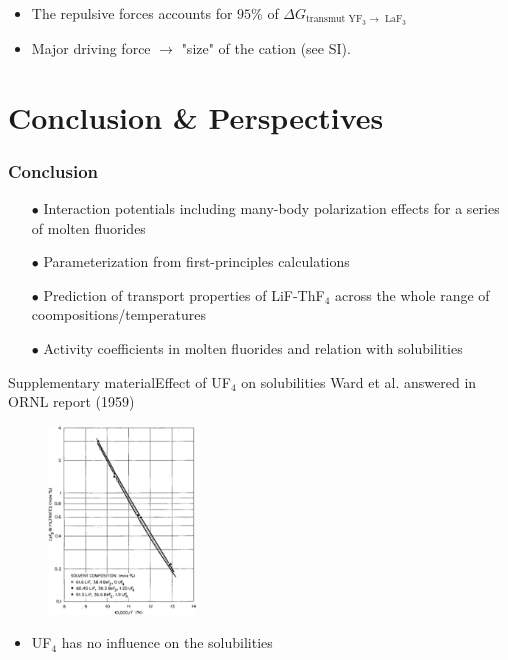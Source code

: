 \documentclass{beamer}
\begin{document}
\begin{frame}
\begin{columns}
\begin{column}{7cm}
\begin{figure}
            \end{figure}
        \end{column}
    \end{columns}
    \begin{itemize}
        \item The repulsive forces accounts for $95 \%$ of $\Delta G_{\text{transmut YF}_3 \rightarrow\text{ LaF}_3}$
        \item Major driving force $\rightarrow$ "size" of the cation (see SI).
    \end{itemize}
\end{frame}
\section{Conclusion \& Perspectives}

\begin{frame}
   \frametitle{Conclusion}
   \begin{itemize}
      \item[$\bullet$] Interaction potentials including many-body polarization effects for a series of molten fluorides
      \item[$\bullet$] Parameterization from first-principles calculations
      \item[$\bullet$] Prediction of transport properties of LiF-ThF$_4$ across the whole range of coompositions/temperatures
      \item[$\bullet$] \alert{Activity coefficients in molten fluorides and relation with solubilities} 
   \end{itemize}
\end{frame}

\begin{frame}{Supplementary material}{Effect of UF$_4$ on solubilities}
    Ward et al. answered in ORNL report (1959)
    \begin{figure}
        \includegraphics[height=5cm]{UF4effectOnSolubilities}
    \end{figure}
    \begin{itemize}
        \item UF$_4$ has no influence on the solubilities
    \end{itemize}
\end{frame}
\end{document}
